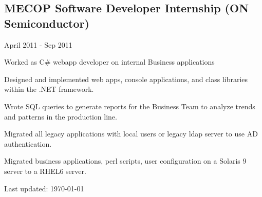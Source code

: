 \documentclass[10pt,letterpaper]{article}
\renewenvironment{itemize}{
  \begin{list}{}{
    \setlength{\leftmargin}{1.5em}
    \setlength{\itemsep}{0.25em}
    \setlength{\parskip}{0pt}
    \setlength{\parsep}{0.25em}
  }
}{
  \end{list}
}
\begin{document}
\subsection*{MECOP Software Developer Internship (ON Semiconductor)}
\begin{itemize}

    \item April 2011 - Sep 2011
    \item Worked as C\# webapp developer on internal Business applications
    \item Designed and implemented web apps, console applications, and class libraries within the .NET framework.
    \item Wrote SQL queries to generate reports for the Business Team to analyze trends and patterns in the production line.
    \item Migrated all legacy applications with local users or legacy ldap server to use AD authentication.
    \item Migrated business applications, perl scripts, user configuration on a Solaris 9 server to a RHEL6 server.

\end{itemize}


\bigskip

\begin{center}
  \begin{small}
    Last updated: \today
  \end{small}
\end{center}
\end{document}
